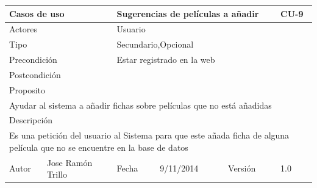 \documentclass{article}
\begin{document}
\begin{table}[h]
\begin{tabular}{|l|l|l|l|l|l|}
\hline
\multicolumn{2}{|p{2cm}|}{Casos de uso}  & \multicolumn{3}{p{7cm}|}{\textbf{Sugerencias de películas a añadir}} & CU-9 \\
\hline
\multicolumn{2}{|p{2cm}|}{Actores}       & \multicolumn{4}{p{8cm}|}{Usuario}        \\
\hline
\multicolumn{2}{|p{2cm}|}{Tipo}          & \multicolumn{4}{p{8cm}|}{Secundario,Opcional}        \\
\hline
\multicolumn{2}{|p{2cm}|}{Precondición}  & \multicolumn{4}{p{8cm}|}{Estar registrado en la web}        \\
\hline
\multicolumn{2}{|p{2cm}|}{Postcondición} & \multicolumn{4}{p{8cm}|}{}        \\
\hline
\multicolumn{6}{|p{10cm}|}{Proposito}                                   \\
\hline
\multicolumn{6}{|p{10cm}|}{Ayudar al sistema a añadir fichas sobre películas que no está añadidas}                                            \\
\hline
\multicolumn{6}{|p{10cm}|}{Descripción}                                 \\
\hline
\multicolumn{6}{|p{10cm}|}{Es una petición del usuario al Sistema para que este añada ficha de alguna película que no se encuentre en la base de datos}                                            \\
\hline
Autor              &    Jose Ramón Trillo         & Fecha    &  9/11/2014   &   Versión  &1.0\\
\hline
\end{tabular}
\end{table}
\end{document}
